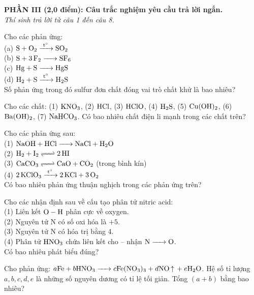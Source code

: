 \documentclass[12pt,a4paper]{article}
\begin{document}
\bigskip
\noindent
\textbf{PHẦN III (2,0 điểm): Câu trắc nghiệm yêu cầu trả lời ngắn.}\\
\textit{Thí sinh trả lời từ câu 1 đến câu 8.}

\begin{ex}
Cho các phản ứng:\\
(a) $\ce{S + O2 ->[t^\circ] SO2}$\\
(b) $\ce{S + 3F2 -> SF6}$\\
(c) $\ce{Hg + S -> HgS}$\\
(d) $\ce{H2 + S ->[t^\circ] H2S}$\\
Số phản ứng trong đó sulfur đơn chất đóng vai trò chất khử là bao nhiêu?
\shortans{}
\loigiai{}
\end{ex}

\begin{ex}
Cho các chất: (1) $\ce{KNO3}$, (2) $\ce{HCl}$, (3) $\ce{HClO}$, (4) $\ce{H2S}$, (5) $\ce{Cu(OH)2}$, (6) $\ce{Ba(OH)2}$, (7) $\ce{NaHCO3}$. Có bao nhiêu chất điện li mạnh trong các chất trên?
\shortans{}
\loigiai{}
\end{ex}

\begin{ex}
Cho các phản ứng sau:\\
(1) $\ce{NaOH + HCl -> NaCl + H2O}$\\
(2) $\ce{H2 + I2 <=> 2HI}$\\
(3) $\ce{CaCO3 <=> CaO + CO2}$ (trong bình kín)\\
(4) $\ce{2KClO3 ->[t^\circ] 2KCl + 3O2}$\\
Có bao nhiêu phản ứng thuận nghịch trong các phản ứng trên?
\shortans{}
\loigiai{}
\end{ex}

\begin{ex}
Cho các nhận định sau về cấu tạo phân tử nitric acid:\\
(1) Liên kết $\ce{O - H}$ phân cực về oxygen.\\
(2) Nguyên tử N có số oxi hóa là $+5$.\\
(3) Nguyên tử N có hóa trị bằng 4.\\
(4) Phân tử $\ce{HNO3}$ chứa liên kết cho -- nhận $\ce{N -> O}$.\\
Có bao nhiêu phát biểu đúng?
\shortans{}
\loigiai{}
\end{ex}

\begin{ex}
Cho phản ứng: $a\ce{Fe} + b\ce{HNO3 ->} c\ce{Fe(NO3)3} + d\ce{NO ^} + e\ce{H2O}$. Hệ số tỉ lượng $a, b, c, d, e$ là những số nguyên dương có tỉ lệ tối giản. Tổng $(a + b)$ bằng bao nhiêu?
\shortans{}
\loigiai{}
\end{ex}
\end{document}
